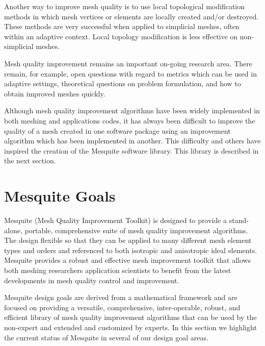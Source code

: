 \documentclass[letter]{report}
\begin{document}
Another way to improve mesh quality is to use local topological modification methods in which mesh vertices or elements are locally created and/or destroyed. These methods are very successful when applied to simplicial meshes, often within an adaptive context.  Local topology modification is less effective on non-simplicial meshes. \newline

Mesh quality improvement remains an important on-going research area. 
There remain, for example, open questions with regard to metrics which 
can be used in adaptive settings, theoretical questions on problem 
formulation, and how to obtain improved meshes quickly. \newline

Although mesh quality improvement algorithms have been widely implemented 
in both meshing and applications codes, it has always been difficult to 
improve the quality of a mesh created in one software package using an 
improvement algorithm which has been implemented in another.  This difficulty
and others have inspired the creation of the Mesquite software library. 
This library is described in the next section. \newline


\section{Mesquite Goals}
Mesquite (Mesh Quality Improvement Toolkit) is designed to provide a
stand-alone, portable, comprehensive suite of mesh quality improvement
algorithms.  The design flexible so that they can be applied to many
different mesh element types and orders and referenced to both
isotropic and anisotropic ideal elements.  Mesquite provides a robust
and effective mesh improvement toolkit that allows both meshing
researchers application scientists to benefit from the latest
developments in mesh quality control and improvement. \newline

Mesquite design goals are derived from a mathematical framework and
are focused on providing a versatile, comprehensive, inter-operable,
robust, and efficient library of mesh quality improvement algorithms
that can be used by the non-expert and extended and customized by
experts.  In this section we highlight the current status of Mesquite
in several of our design goal areas. \newline
\end{document}
